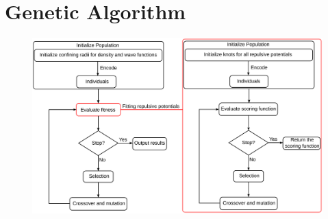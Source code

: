 \pagebreak
\section{Genetic Algorithm}
\begin{figure}[H]
  \centering
  \label{fig:ga}
  \includegraphics[scale=0.5, angle=0]{ga.eps}
\end{figure}

